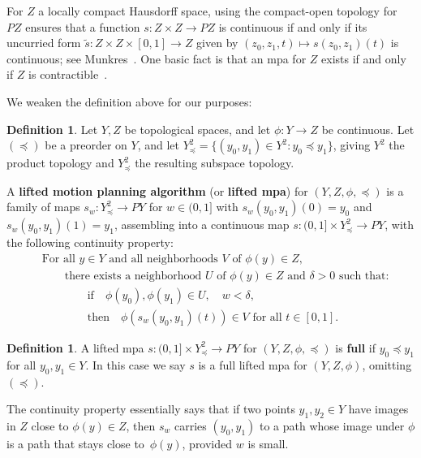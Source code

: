 \documentclass[11pt, reqno, english]{amsart}
\theoremstyle{plain}
\theoremstyle{definition}
\newtheorem{definition}[theorem]{Definition}
\begin{document}
For $Z$ a locally compact Hausdorff space, using the compact-open topology for $PZ$ ensures that a function $s\colon Z
\times Z \rightarrow PZ$ is continuous if and only if its uncurried form $\widetilde{s}\colon
Z \times Z \times [0, 1] \rightarrow Z$ given by $(z_{0}, z_{1}, t) \mapsto
s(z_{0}, z_{1})(t)$ is continuous; see Munkres~\cite[Thm.~46.11]{munkres2014}. One basic fact is that an
mpa for $Z$ exists if and only if $Z$ is contractible~\cite{farber2003}.

We weaken the definition above for our purposes:

\begin{definition}
  Let $Y, Z$ be topological spaces, and let $\phi\colon Y \rightarrow Z$ be
  continuous. Let $(\preceq)$ be a preorder on $Y$, and let $Y^{2}_{\preceq} =
  \{(y_{0}, y_{1}) \in Y^{2} : y_{0} \preceq y_{1}\}$, giving $Y^{2}$ the
  product topology and $Y^{2}_{\preceq}$ the resulting subspace topology.
  
  A \textbf{lifted motion planning algorithm} (or \textbf{lifted mpa}) for $(Y,
  Z, \phi, \preceq)$ is a family of maps $s_{w}\colon Y^{2}_{\preceq}
  \rightarrow PY$ for $w \in (0, 1]$ with $s_{w}(y_{0}, y_{1})(0) = y_{0}$ and
  $s_{w}(y_{0}, y_{1})(1) = y_{1}$, assembling into a continuous map $s\colon
  (0, 1] \times Y^{2}_{\preceq} \rightarrow PY$, with the following continuity
  property:
  \begin{align*}
    &\text{For all $y \in Y$ and all neighborhoods $V$ of $\phi(y) \in Z$,}\\
    &\qquad\text{there exists a neighborhood $U$ of $\phi(y) \in Z$ and $\delta
    > 0$ such that:}\\
    &\qquad\qquad\text{if}\quad \phi(y_{0}), \phi(y_{1}) \in U, \quad w <
    \delta,\\
    &\qquad\qquad\text{then}\quad \phi(s_{w}(y_{0}, y_{1})(t)) \in V \text{ for
    all } t \in [0, 1].
  \end{align*}
\end{definition}

\begin{definition}
  A lifted mpa $s\colon (0, 1] \times Y^{2}_{\preceq} \rightarrow PY$ 
  for $(Y, Z, \phi, \preceq)$ is \textbf{full} if $y_{0}
  \preceq y_{1}$ for all $y_{0}, y_{1} \in Y$. In this case we say $s$ is a
  full lifted mpa for $(Y, Z, \phi)$, omitting $(\preceq)$.
\end{definition}

The continuity property essentially says that if two points $y_{1}, y_{2} \in
Y$ have images in $Z$ close to $\phi(y) \in Z$, then $s_{w}$ carries $(y_{0},
y_{1})$ to a path whose image under $\phi$ is a path that stays close to~$\phi(y)$, 
provided $w$ is small.
\end{document}
